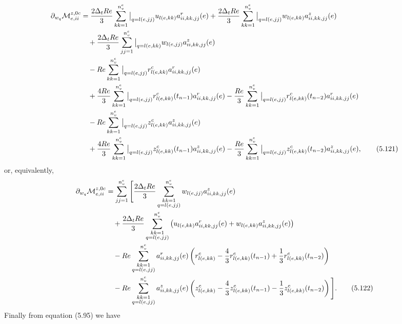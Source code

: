 \documentclass{article}
\begin{document}
\begin{align}
\partial_{w_q}\mathcal{M}_{e,ii}^{z,0c} &= \frac{2\Delta_t Re}{3} \sum_{kk=1}^{n_v^e} \big|_{q=l(e,jj)} u_{l(e,kk)} a_{ii,kk,jj}^r(e) + \frac{2\Delta_t Re}{3} \sum_{kk=1}^{n_v^e} \big|_{q=l(e,jj)} w_{l(e,kk)} a_{ii,kk,jj}^z(e) \nonumber\\
&\quad + \frac{2\Delta_t Re}{3} \sum_{jj=1}^{n_v^e} \big|_{q=l(e,kk)} w_{l(e,jj)} a_{ii,kk,jj}^z(e) \nonumber\\
&\quad - Re \sum_{kk=1}^{n_v^e} \big|_{q=l(e,jj)} r_{l(e,kk)}^c a_{ii,kk,jj}^r(e) \nonumber\\
&\quad + \frac{4Re}{3} \sum_{kk=1}^{n_v^e} \big|_{q=l(e,jj)} r_{l(e,kk)}^c(t_{n-1}) a_{ii,kk,jj}^r(e) - \frac{Re}{3} \sum_{kk=1}^{n_v^e} \big|_{q=l(e,jj)} r_{l(e,kk)}^c(t_{n-2}) a_{ii,kk,jj}^r(e) \nonumber\\
&\quad - Re \sum_{kk=1}^{n_v^e} \big|_{q=l(e,jj)} z_{l(e,kk)}^c a_{ii,kk,jj}^z(e) \nonumber\\
&\quad + \frac{4Re}{3} \sum_{kk=1}^{n_v^e} \big|_{q=l(e,jj)} z_{l(e,kk)}^c(t_{n-1}) a_{ii,kk,jj}^z(e) - \frac{Re}{3} \sum_{kk=1}^{n_v^e} \big|_{q=l(e,jj)} z_{l(e,kk)}^c(t_{n-2}) a_{ii,kk,jj}^z(e), \tag{5.121}
\end{align}
or, equivalently,
\begin{align}
\partial_{w_q}\mathcal{M}_{e,ii}^{z,0c} &= \sum_{jj=1}^{n_v^e} \Bigg[ \frac{2\Delta_t Re}{3} \sum_{\substack{kk=1\\ q=l(e,jj)}}^{n_v^e} w_{l(e,jj)} a_{ii,kk,jj}^z(e) \nonumber\\
&\quad + \frac{2\Delta_t Re}{3} \sum_{\substack{kk=1\\ q=l(e,jj)}}^{n_v^e} \left( u_{l(e,kk)} a_{ii,kk,jj}^r(e) + w_{l(e,kk)} a_{ii,kk,jj}^z(e) \right) \nonumber\\
&\quad - Re \sum_{\substack{kk=1\\ q=l(e,jj)}}^{n_v^e} a_{ii,kk,jj}^r(e) \left( r_{l(e,kk)}^c - \frac{4}{3} r_{l(e,kk)}^c(t_{n-1}) + \frac{1}{3} r_{l(e,kk)}^c(t_{n-2}) \right) \nonumber\\
&\quad - Re \sum_{\substack{kk=1\\ q=l(e,jj)}}^{n_v^e} a_{ii,kk,jj}^z(e) \left( z_{l(e,kk)}^c - \frac{4}{3} z_{l(e,kk)}^c(t_{n-1}) - \frac{1}{3} z_{l(e,kk)}^c(t_{n-2}) \right) \Bigg]. \tag{5.122}
\end{align}
Finally from equation (5.95) we have
\end{document}

